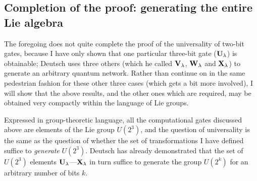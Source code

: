 \subsection{Completion of the proof: generating the entire Lie algebra}
\label{sec:level4}

The foregoing does not quite complete the proof of the universality of
two-bit gates, because I have only shown that one particular three-bit
gate (${\bf U}_\lambda$) is obtainable; Deutsch uses three others
(which he called ${\bf V}_\lambda$, ${\bf W}_\lambda$ and ${\bf X}_\lambda$)
to generate an arbitrary quantum network.  Rather than continue on in the
same pedestrian fashion for these other three cases (which gets a bit more
involved), I will show that the above results, and the
other ones which are required, may be obtained very compactly within the
language of Lie groups\cite{MWtal}.

Expressed in group-theoretic language, all the computational gates discussed
above are elements of the Lie group $U(2^3)$, and the question of universality
is the same as the question of whether the set of transformations I have
defined suffice to {\em generate} $U(2^3)$.  Deutsch has already demonstrated
that the set of $U(2^3)$ elements ${\bf U}_\lambda$---${\bf X}_\lambda$ in
turn suffice to generate the group $U(2^k)$ for an arbitrary number of bits
$k$.

